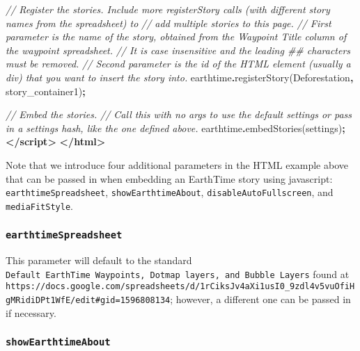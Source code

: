 \documentclass[
]{krantz}
\makeatletter
\newenvironment{Shaded}{\begin{snugshade}}{\end{snugshade}}
\newcommand{\CommentTok}[1]{\textcolor[rgb]{0.37,0.37,0.37}{\textit{#1}}}
\newcommand{\FunctionTok}[1]{\textcolor[rgb]{0,0,0}{#1}}
\newcommand{\KeywordTok}[1]{\textcolor[rgb]{0.27,0.27,0.27}{\textbf{#1}}}
\newcommand{\NormalTok}[1]{#1}
\newcommand{\OperatorTok}[1]{\textcolor[rgb]{0.43,0.43,0.43}{\textbf{#1}}}
\newcommand{\StringTok}[1]{\textcolor[rgb]{0.5,0.5,0.5}{#1}}
\newenvironment{kframe}{%
\medskip{}
\setlength{\fboxsep}{.8em}
 \def\at@end@of@kframe{}%
 \ifinner\ifhmode%
  \def\at@end@of@kframe{\end{minipage}}%
  \begin{minipage}{\columnwidth}%
 \fi\fi%
 \def\FrameCommand##1{\hskip\@totalleftmargin \hskip-\fboxsep
 \colorbox{shadecolor}{##1}\hskip-\fboxsep
     \hskip-\linewidth \hskip-\@totalleftmargin \hskip\columnwidth}%
 \MakeFramed {\advance\hsize-\width
   \@totalleftmargin\z@ \linewidth\hsize
   \@setminipage}}%
 {\par\unskip\endMakeFramed%
 \at@end@of@kframe}
\renewenvironment{Shaded}{\begin{kframe}}{\end{kframe}}
\makeatother
\begin{document}
\begin{Shaded}
\begin{Highlighting}[]
    \CommentTok{// Register the stories. Include more registerStory calls (with different story names from the spreadsheet) to }
    \CommentTok{// add multiple stories to this page.}
    \CommentTok{// First parameter is the name of the story, obtained from the \textquotesingle{}Waypoint Title\textquotesingle{} column of the waypoint spreadsheet. }
    \CommentTok{// It is case insensitive and the leading \textquotesingle{}\#\#\textquotesingle{} characters must be removed.}
    \CommentTok{// Second parameter is the id of the HTML element (usually a div) that you want to insert the story into.}
\NormalTok{    earthtime}\OperatorTok{.}\FunctionTok{registerStory}\NormalTok{(}\StringTok{\textquotesingle{}Deforestation\textquotesingle{}}\OperatorTok{,} \StringTok{\textquotesingle{}story\_container1\textquotesingle{}}\NormalTok{)}\OperatorTok{;}

    \CommentTok{// Embed the stories.}
    \CommentTok{// Call this with no args to use the default settings or pass in a settings hash, like the one defined above.}
\NormalTok{    earthtime}\OperatorTok{.}\FunctionTok{embedStories}\NormalTok{(settings)}\OperatorTok{;}
  \KeywordTok{\textless{}/script\textgreater{}}
\KeywordTok{\textless{}/html\textgreater{}}
\end{Highlighting}
\end{Shaded}

Note that we introduce four additional parameters in the HTML example above that can be passed in when embedding an EarthTime story using javascript: \texttt{earthtimeSpreadsheet}, \texttt{showEarthtimeAbout}, \texttt{disableAutoFullscreen}, and \texttt{mediaFitStyle}.

\hypertarget{earthtimespreadsheet}{%
\subsubsection*{\texorpdfstring{\texttt{earthtimeSpreadsheet}}{earthtimeSpreadsheet}}\label{earthtimespreadsheet}}


This parameter will default to the standard \texttt{Default\ EarthTime\ Waypoints,\ Dotmap\ layers,\ and\ Bubble\ Layers} found at \texttt{https://docs.google.com/spreadsheets/d/1rCiksJv4aXi1usI0\_9zdl4v5vuOfiHgMRidiDPt1WfE/edit\#gid=1596808134}; however, a different one can be passed in if necessary.

\hypertarget{showearthtimeabout}{%
\subsubsection*{\texorpdfstring{\texttt{showEarthtimeAbout}}{showEarthtimeAbout}}\label{showearthtimeabout}}
\end{document}
